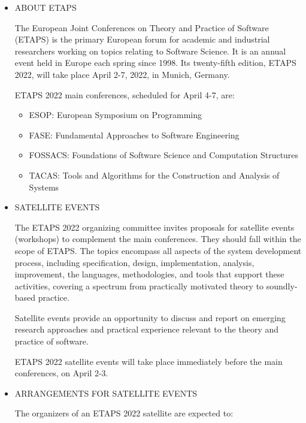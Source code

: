 \documentclass[prodmode,acmtecs]{acmsmall} %
\begin{document}
\begin{itemize}\item  ABOUT ETAPS 
 
  The European Joint Conferences on Theory and Practice of Software  (ETAPS) is the primary European forum for academic and industrial researchers working on topics relating to Software Science. It is an annual event held in Europe each spring since 1998. Its twenty-fifth edition, ETAPS 2022, will take place April 2-7, 2022, in Munich, Germany.  
 
  ETAPS 2022 main conferences, scheduled for April 4-7, are:  
 
\begin{itemize}\item  ESOP: European Symposium on Programming 
\item  FASE: Fundamental Approaches to Software Engineering 
\item  FOSSACS: Foundations of Software Science and Computation Structures 
\item  TACAS: Tools and Algorithms for the Construction and Analysis of Systems 
\end{itemize} 
\item  SATELLITE EVENTS 
 
  The ETAPS 2022 organizing committee invites proposals for satellite events (workshops) to complement the main conferences. They should fall within the scope of ETAPS. The topics encompass all aspects of the system development process, including specification, design, implementation, analysis, improvement, the languages, methodologies, and tools that support these activities, covering a spectrum from practically motivated theory to soundly-based practice. 
 
  Satellite events provide an opportunity to discuss and report on emerging research approaches and practical experience relevant to the theory and practice of software.  
 
  ETAPS 2022 satellite events will take place immediately before the main conferences, on April 2-3. 
 
\item  ARRANGEMENTS FOR SATELLITE EVENTS 
 
  The organizers of an ETAPS 2022 satellite are expected to: 
 

\end{itemize}
\end{document}
